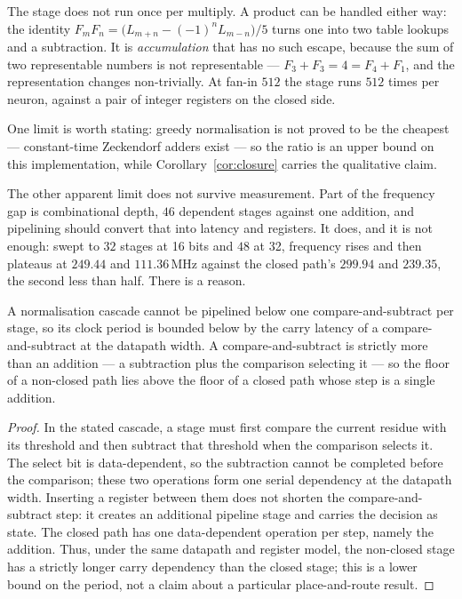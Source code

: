 The stage does not run once per multiply. A product can be handled either way:
the identity $F_mF_n = \bigl(L_{m+n}-(-1)^nL_{m-n}\bigr)/5$ turns one into two
table lookups and a subtraction. It is \emph{accumulation} that has no such
escape, because the sum of two representable numbers is not representable ---
$F_3+F_3 = 4 = F_4+F_1$, and the representation changes non-trivially. At fan-in
$512$ the stage runs $512$ times per neuron, against a pair of integer registers
on the closed side.

One limit is worth stating: greedy normalisation is not proved to be the
cheapest --- constant-time Zeckendorf adders exist --- so the ratio is an upper
bound on this implementation, while Corollary~\ref{cor:closure} carries the
qualitative claim.

The other apparent limit does not survive measurement. Part of the frequency gap
is combinational depth, $46$ dependent stages against one addition, and
pipelining should convert that into latency and registers. It does, and it is
not enough: swept to $32$ stages at 16 bits and $48$ at 32, frequency rises and
then plateaus at $249.44$ and $111.36$\,MHz against the closed path's $299.94$
and $239.35$, the second less than half. There is a reason.

\begin{theorem}\label{thm:normfloor}
A normalisation cascade cannot be pipelined below one compare-and-subtract per
stage, so its clock period is bounded below by the carry latency of a
compare-and-subtract at the datapath width. A compare-and-subtract is strictly
more than an addition --- a subtraction plus the comparison selecting it --- so
the floor of a non-closed path lies above the floor of a closed path whose step
is a single addition.
\end{theorem}
\begin{proof}
In the stated cascade, a stage must first compare the current residue with its
threshold and then subtract that threshold when the comparison selects it.
The select bit is data-dependent, so the subtraction cannot be completed before
the comparison; these two operations form one serial dependency at the
datapath width. Inserting a register between them does not shorten the
compare-and-subtract step: it creates an additional pipeline stage and carries
the decision as state. The closed path has one data-dependent operation per
step, namely the addition. Thus, under the same datapath and register model,
the non-closed stage has a strictly longer carry dependency than the closed
stage; this is a lower bound on the period, not a claim about a particular
place-and-route result.
\end{proof}

